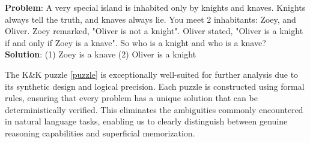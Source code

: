 \begin{tcolorbox}[
    colframe=blue!70!black, %
    colback=blue!10!white, %
    coltitle=white, %
    fonttitle=\bfseries, %
    title=An example of a K\&K puzzle\label{long_open_q}, %
    sharp corners, %
    boxrule=0.5mm, %
]
\textbf{Problem}:  
A very special island is inhabited only by knights and knaves. Knights always tell the truth, and knaves always lie. You meet 2 inhabitants: Zoey, and Oliver. Zoey remarked, "Oliver is not a knight". Oliver stated, "Oliver is a knight if and only if Zoey is a knave". So who is a knight and who is a knave? \\

\textbf{Solution}:  
(1) Zoey is a knave (2) Oliver is a knight
\label{puzzle}
\end{tcolorbox}

\vspace{2mm}
The K\&K puzzle \ref{puzzle} is exceptionally well-suited for further analysis due to its synthetic design and logical precision. Each puzzle is constructed using formal rules, ensuring that every problem has a unique solution that can be deterministically verified. This eliminates the ambiguities commonly encountered in natural language tasks, enabling us to clearly distinguish between genuine reasoning capabilities and superficial memorization.


